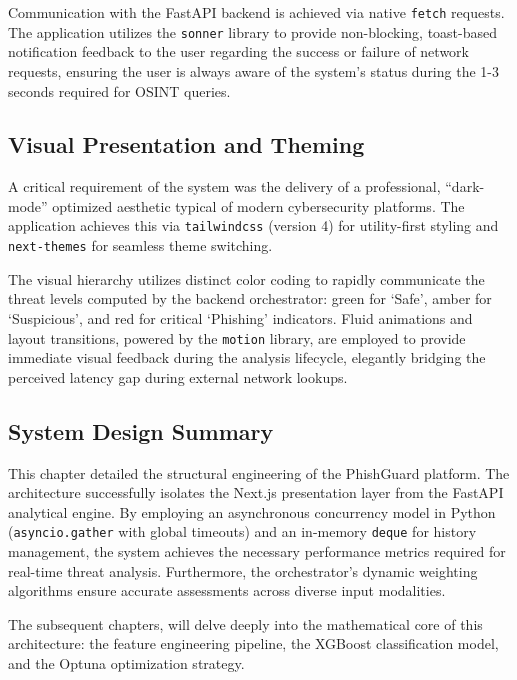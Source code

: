 Communication with the FastAPI backend is achieved via native
\texttt{fetch} requests. The application utilizes the \texttt{sonner}
library to provide non-blocking, toast-based notification feedback to
the user regarding the success or failure of network requests, ensuring
the user is always aware of the system's status during the 1-3 seconds
required for OSINT queries.

\subsection{Visual Presentation and
Theming}\label{visual-presentation-and-theming}

A critical requirement of the system was the delivery of a professional,
``dark-mode'' optimized aesthetic typical of modern cybersecurity
platforms. The application achieves this via \texttt{tailwindcss}
(version 4) for utility-first styling and \texttt{next-themes} for
seamless theme switching.

The visual hierarchy utilizes distinct color coding to rapidly
communicate the threat levels computed by the backend orchestrator:
green for `Safe', amber for `Suspicious', and red for critical
`Phishing' indicators. Fluid animations and layout transitions, powered
by the \texttt{motion} library, are employed to provide immediate visual
feedback during the analysis lifecycle, elegantly bridging the perceived
latency gap during external network lookups.

\subsection{System Design Summary}\label{summary-1}

This chapter detailed the structural engineering of the PhishGuard
platform. The architecture successfully isolates the Next.js
presentation layer from the FastAPI analytical engine. By employing an
asynchronous concurrency model in Python (\texttt{asyncio.gather} with
global timeouts) and an in-memory \texttt{deque} for history management,
the system achieves the necessary performance metrics required for
real-time threat analysis. Furthermore, the orchestrator's dynamic
weighting algorithms ensure accurate assessments across diverse input
modalities.

The subsequent chapters, will delve deeply into the
mathematical core of this architecture: the feature engineering
pipeline, the XGBoost classification model, and the Optuna optimization
strategy.



